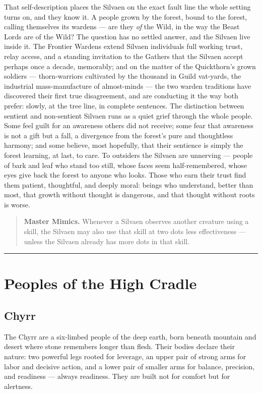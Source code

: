 That self-description places the Silvaen on the exact fault line the whole setting turns on, and they know it. A people grown by the forest, bound to the forest, calling themselves its wardens --- are they \textit{of} the Wild, in the way the Beast Lords are of the Wild? The question has no settled answer, and the Silvaen live inside it. The Frontier Wardens extend Silvaen individuals full working trust, relay access, and a standing invitation to the Gathers that the Silvaen accept perhaps once a decade, memorably; and on the matter of the Quickthorn's grown soldiers --- thorn-warriors cultivated by the thousand in Guild vat-yards, the industrial mass-manufacture of almost-minds --- the two warden traditions have discovered their first true disagreement, and are conducting it the way both prefer: slowly, at the tree line, in complete sentences. The distinction between sentient and non-sentient Silvaen runs as a quiet grief through the whole people. Some feel guilt for an awareness others did not receive; some fear that awareness is not a gift but a fall, a divergence from the forest's pure and thoughtless harmony; and some believe, most hopefully, that their sentience is simply the forest learning, at last, to care. To outsiders the Silvaen are unnerving --- people of bark and leaf who stand too still, whose faces seem half-remembered, whose eyes give back the forest to anyone who looks. Those who earn their trust find them patient, thoughtful, and deeply moral: beings who understand, better than most, that growth without thought is dangerous, and that thought without roots is worse.

\begin{quote}
\textbf{Master Mimics.} Whenever a Silvaen observes another creature using a skill, the Silvaen may also use that skill at two dots less effectiveness --- unless the Silvaen already has more dots in that skill.
\end{quote}

\bigskip
\hrule
\bigskip

\section{Peoples of the High Cradle}

\subsection{Chyrr}

The Chyrr are a six-limbed people of the deep earth, born beneath mountain and desert where stone remembers longer than flesh. Their bodies declare their nature: two powerful legs rooted for leverage, an upper pair of strong arms for labor and decisive action, and a lower pair of smaller arms for balance, precision, and readiness --- always readiness. They are built not for comfort but for alertness.

